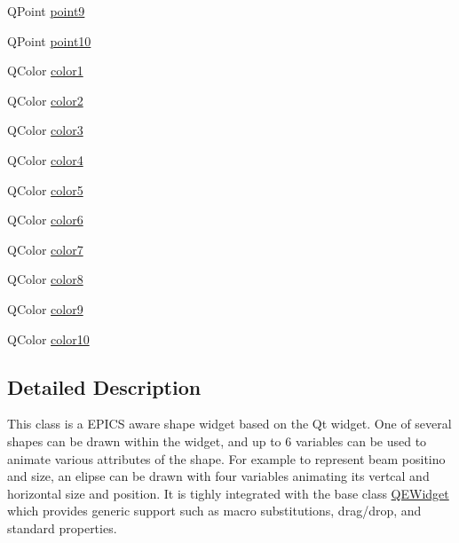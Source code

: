 \begin{DoxyCompactItemize}
QPoint \hyperlink{classQEShape_af3718d1ab3026126417cf53eb500b556}{point9}
\item 
QPoint \hyperlink{classQEShape_a3557c0b5e19c30b482b774f1da72313c}{point10}
\item 
QColor \hyperlink{classQEShape_ae2ec6b8b11786ae2f4db555e08c9c674}{color1}
\item 
QColor \hyperlink{classQEShape_ad8675dd4a120598ed1ec2f50865be077}{color2}
\item 
QColor \hyperlink{classQEShape_a663e1f40fefc23971da89554242c8343}{color3}
\item 
QColor \hyperlink{classQEShape_a74e07320c37ad47f5dda20016385ae6d}{color4}
\item 
QColor \hyperlink{classQEShape_ad8a11f05889b2a64719a4e74e29a2714}{color5}
\item 
QColor \hyperlink{classQEShape_af08cdd85e181933be792886e7c6e9bc5}{color6}
\item 
QColor \hyperlink{classQEShape_a3b77f142d12dfeb5267d0b214f135f34}{color7}
\item 
QColor \hyperlink{classQEShape_ad127eb638763dfa278dbe35d21bcc3f4}{color8}
\item 
QColor \hyperlink{classQEShape_ab12e5d604756ac4fa449f3569cc379f5}{color9}
\item 
QColor \hyperlink{classQEShape_a4f5c3588b67f1a3d5e13b96b1d80a128}{color10}
\end{DoxyCompactItemize}


\subsection{Detailed Description}
This class is a EPICS aware shape widget based on the Qt widget. One of several shapes can be drawn within the widget, and up to 6 variables can be used to animate various attributes of the shape. For example to represent beam positino and size, an elipse can be drawn with four variables animating its vertcal and horizontal size and position. It is tighly integrated with the base class \hyperlink{classQEWidget}{QEWidget} which provides generic support such as macro substitutions, drag/drop, and standard properties. 

